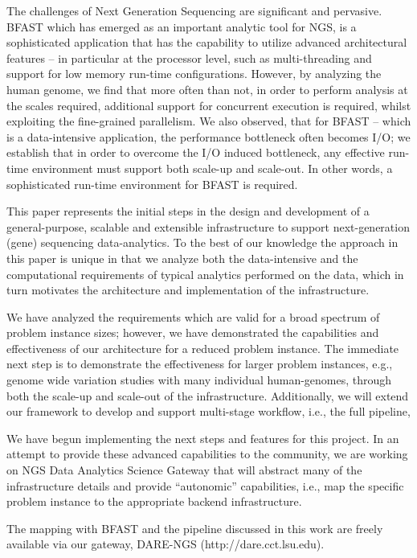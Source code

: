 \documentclass{cpeauth}
\begin{document}
The challenges of Next Generation Sequencing are significant
and pervasive.
BFAST which has emerged as an important analytic tool for NGS, is  a sophisticated application that has the
capability to utilize advanced architectural features -- in particular
at the processor level, such as multi-threading and support for low
memory run-time configurations. However, by analyzing the human
genome, we find that more often than not, in order to perform analysis
at the scales required, additional support for concurrent execution is
required, whilst exploiting the fine-grained parallelism. We also
observed, that for BFAST -- which is a data-intensive application,
the performance bottleneck often becomes I/O; we establish that in
order to overcome the I/O induced bottleneck, any effective run-time
environment must support both scale-up and scale-out. In other words,
a sophisticated run-time environment for BFAST is required.

This paper represents the initial steps in the design and development
of a general-purpose, scalable and extensible infrastructure to
support next-generation (gene) sequencing data-analytics. To the best
of our knowledge the approach in this paper is unique in that we
analyze both the data-intensive and the computational requirements of
typical analytics performed on the data, which in turn motivates the
architecture and implementation of the infrastructure. 

We have analyzed the requirements which are valid for a broad spectrum
of problem instance sizes; however, we have demonstrated the
capabilities and effectiveness of our architecture for a reduced
problem instance. The immediate next step is to demonstrate the
effectiveness for larger problem instances, e.g., genome wide variation studies with many individual human-genomes,
through both the scale-up and scale-out of the infrastructure.
Additionally, we will extend our framework to develop and support
multi-stage workflow, i.e., the full pipeline,
 
We have begun implementing the next steps and features for this
project. In an attempt to provide these advanced capabilities to the
community, we are working on NGS Data Analytics Science Gateway that
will abstract many of the infrastructure details and provide
``autonomic'' capabilities, i.e., map the specific problem instance to
the appropriate backend infrastructure.

The mapping with BFAST and the pipeline discussed in this work are freely available via our gateway, DARE-NGS (http://dare.cct.lsu.edu).
\end{document}
